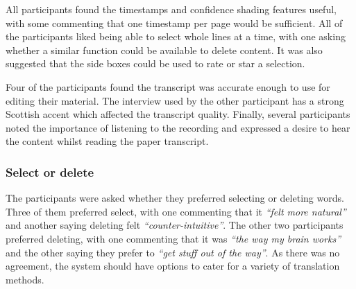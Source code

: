 All participants found the timestamps and confidence shading features useful, with some commenting that one timestamp
per page would be sufficient.  All of the participants liked being able to select whole lines at a time, with one
asking whether a similar function could be available to delete content. It was also suggested that the side boxes could
be used to rate or star a selection.

Four of the participants found the transcript was accurate enough to use for editing their material.  The interview
used by the other participant has a strong Scottish accent which affected the transcript quality. Finally, several
participants noted the importance of listening to the recording and expressed a desire to hear the content whilst
reading the paper transcript.

\subsubsection{Select or delete}
The participants were asked whether they preferred selecting or deleting words. Three of them preferred select, with
one commenting that it \textit{``felt more natural''} and another saying deleting felt \textit{``counter-intuitive''}.
The other two participants preferred deleting, with one commenting that it was \textit{``the way my brain works''} and
the other saying they prefer to \textit{``get stuff out of the way''}. As there was no agreement, the system should
have options to cater for a variety of translation methods.










